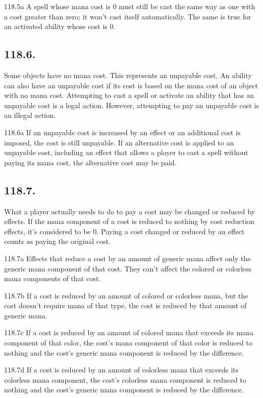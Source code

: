 118.5a A spell whose mana cost is {0} must still be cast the same way as one with a cost greater than zero; it won’t cast itself automatically. The same is true for an activated ability whose cost is {0}.

\subsection*{118.6.}
Some objects have no mana cost. This represents an unpayable cost. An ability can also have an unpayable cost if its cost is based on the mana cost of an object with no mana cost. Attempting to cast a spell or activate an ability that has an unpayable cost is a legal action. However, attempting to pay an unpayable cost is an illegal action.

118.6a If an unpayable cost is increased by an effect or an additional cost is imposed, the cost is still unpayable. If an alternative cost is applied to an unpayable cost, including an effect that allows a player to cast a spell without paying its mana cost, the alternative cost may be paid.

\subsection*{118.7.}
What a player actually needs to do to pay a cost may be changed or reduced by effects. If the mana component of a cost is reduced to nothing by cost reduction effects, it’s considered to be {0}. Paying a cost changed or reduced by an effect counts as paying the original cost.

118.7a Effects that reduce a cost by an amount of generic mana affect only the generic mana component of that cost. They can’t affect the colored or colorless mana components of that cost.

118.7b If a cost is reduced by an amount of colored or colorless mana, but the cost doesn’t require mana of that type, the cost is reduced by that amount of generic mana.

118.7c If a cost is reduced by an amount of colored mana that exceeds its mana component of that color, the cost’s mana component of that color is reduced to nothing and the cost’s generic mana component is reduced by the difference.

118.7d If a cost is reduced by an amount of colorless mana that exceeds its colorless mana component, the cost’s colorless mana component is reduced to nothing and the cost’s generic mana component is reduced by the difference.

